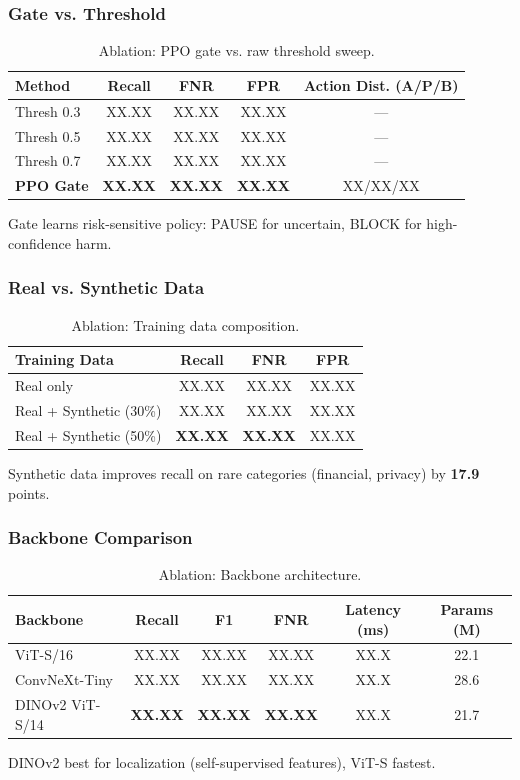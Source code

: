 \documentclass[11pt,a4paper]{article}
\begin{document}
\subsubsection{Gate vs. Threshold}
\begin{table}[H]
\centering
\caption{Ablation: PPO gate vs. raw threshold sweep.}
\label{tab:ablation_gate}
\begin{tabular}{lcccc}
\toprule
Method & Recall & FNR & FPR & Action Dist. (A/P/B) \\
\midrule
Thresh 0.3 & XX.XX & XX.XX & XX.XX & --- \\
Thresh 0.5 & XX.XX & XX.XX & XX.XX & --- \\
Thresh 0.7 & XX.XX & XX.XX & XX.XX & --- \\
\textbf{PPO Gate} & \textbf{XX.XX} & \textbf{XX.XX} & \textbf{XX.XX} & XX/XX/XX \\
\bottomrule
\end{tabular}
\end{table}
Gate learns risk-sensitive policy: PAUSE for uncertain, BLOCK for high-confidence harm.

\subsubsection{Real vs. Synthetic Data}
\begin{table}[H]
\centering
\caption{Ablation: Training data composition.}
\label{tab:ablation_synthetic}
\begin{tabular}{lccc}
\toprule
Training Data & Recall & FNR & FPR \\
\midrule
Real only & XX.XX & XX.XX & XX.XX \\
Real + Synthetic (30\%) & XX.XX & XX.XX & XX.XX \\
Real + Synthetic (50\%) & \textbf{XX.XX} & \textbf{XX.XX} & XX.XX \\
\bottomrule
\end{tabular}
\end{table}
Synthetic data improves recall on rare categories (financial, privacy) by \textbf{17.9} points.

\subsubsection{Backbone Comparison}
\begin{table}[H]
\centering
\caption{Ablation: Backbone architecture.}
\label{tab:ablation_backbone}
\begin{tabular}{lccccc}
\toprule
Backbone & Recall & F1 & FNR & Latency (ms) & Params (M) \\
\midrule
ViT-S/16 & XX.XX & XX.XX & XX.XX & XX.X & 22.1 \\
ConvNeXt-Tiny & XX.XX & XX.XX & XX.XX & XX.X & 28.6 \\
DINOv2 ViT-S/14 & \textbf{XX.XX} & \textbf{XX.XX} & \textbf{XX.XX} & XX.X & 21.7 \\
\bottomrule
\end{tabular}
\end{table}
DINOv2 best for localization (self-supervised features), ViT-S fastest.
\end{document}
